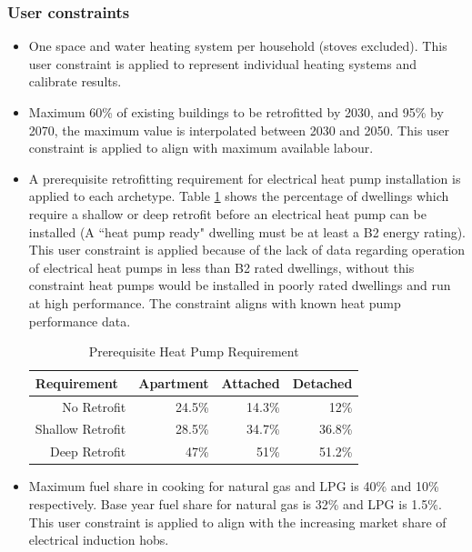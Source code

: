 \documentclass[gmd,manuscript]{copernicus}
\begin{document}
\subsubsection{User constraints}
\begin{itemize}
 \item One space and water heating system per household (stoves excluded). This user constraint is applied to represent individual heating systems and calibrate results.
 \item Maximum 60\% of existing buildings to be retrofitted by 2030, and 95\% by 2070, the maximum value is interpolated between 2030 and 2050. This user constraint is applied to align with maximum available labour.
 \item A prerequisite retrofitting requirement for electrical heat pump installation is applied to each archetype. Table \ref{tab:HeatPumpConstraint} shows the percentage of dwellings which require a shallow or deep retrofit before an electrical heat pump can be installed (A ``heat pump ready" dwelling must be at least a B2 energy rating). This user constraint is applied because of the lack of data regarding operation of electrical heat pumps in less than B2 rated dwellings, without this constraint heat pumps would be installed in poorly rated dwellings and run at high performance. The constraint aligns with known heat pump performance data.
 \begin{table}[htbp]
  \centering
  \footnotesize
  \caption{Prerequisite Heat Pump Requirement}
    \begin{tabular}{r|rrr}
    \hline
    \multicolumn{1}{l}{Requirement} & \multicolumn{1}{l}{Apartment} & \multicolumn{1}{l}{Attached } & \multicolumn{1}{l}{Detached} \\ \hline
    No Retrofit  & 24.5\%   & 14.3\%   & 12\% \\
    Shallow Retrofit  & 28.5\%   & 34.7\%  & 36.8\% \\
    Deep Retrofit  & 47\%   & 51\%  & 51.2\% \\
    \end{tabular}%
  \label{tab:HeatPumpConstraint}%
\end{table}
\item Maximum fuel share in cooking for natural gas and LPG is 40\% and 10\% respectively. Base year fuel share for natural gas is 32\% and LPG is 1.5\%. This user constraint is applied to align with the increasing market share of electrical induction hobs.
\end{itemize}
\end{document}
